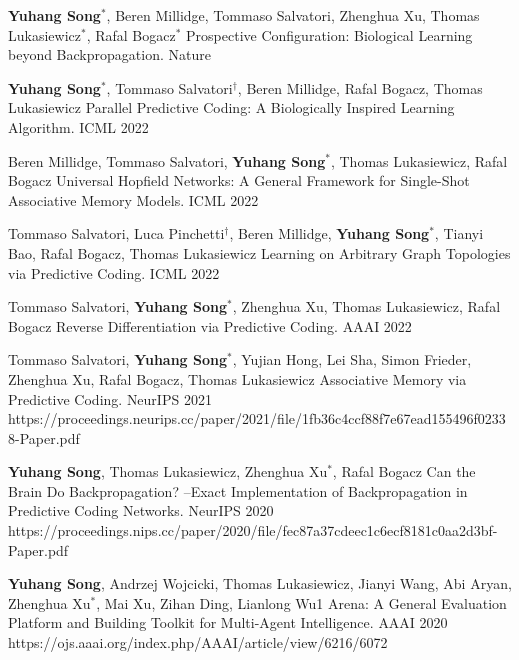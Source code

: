     \Preprint
    {\textbf{Yuhang Song$^*$},
    Beren Millidge,
    Tommaso Salvatori,
    Zhenghua Xu,
    Thomas Lukasiewicz$^*$, 
    Rafal Bogacz$^*$}
    {Prospective Configuration: Biological Learning beyond Backpropagation.}
    {Nature}
    {}
    
    \Preprint
    {\textbf{Yuhang Song$^*$}, 
    Tommaso Salvatori$^\dag$,
    Beren Millidge,
    Rafal Bogacz,
    Thomas Lukasiewicz}
    {Parallel Predictive Coding: A Biologically Inspired Learning Algorithm.}
    {ICML 2022}
    {}
    
    \Preprint
    {Beren Millidge,
    Tommaso Salvatori,
    \textbf{Yuhang Song$^*$}, 
    Thomas Lukasiewicz,
    Rafal Bogacz}
    {Universal Hopfield Networks: A General Framework for Single-Shot Associative Memory Models.}
    {ICML 2022}
    {}
    
    \Preprint
    {Tommaso Salvatori,
    Luca Pinchetti$^\dag$,
    Beren Millidge,
    \textbf{Yuhang Song$^*$},
    Tianyi Bao,
    Rafal Bogacz,
    Thomas Lukasiewicz}
    {Learning on Arbitrary Graph Topologies via Predictive Coding.}
    {ICML 2022}
    {}
	
	\Conference
	{Tommaso Salvatori,
    \textbf{Yuhang Song}$^{*}$,
    Zhenghua Xu,
    Thomas Lukasiewicz, 
    Rafal Bogacz}
    {Reverse Differentiation via Predictive Coding.}
    {AAAI 2022}
    {}
    
    \Conference
    {Tommaso Salvatori,
    \textbf{Yuhang Song}$^{*}$, 
    Yujian Hong,
    Lei Sha,
    Simon Frieder,
    Zhenghua Xu,
    Rafal Bogacz, 
    Thomas Lukasiewicz}
    {Associative Memory via Predictive Coding.}
    {NeurIPS 2021}
    {https://proceedings.neurips.cc/paper/2021/file/1fb36c4ccf88f7e67ead155496f02338-Paper.pdf}
    
    \Conference
    {\textbf{Yuhang Song}, 
    Thomas Lukasiewicz, 
    Zhenghua Xu$^*$, 
    Rafal Bogacz}
    {Can the Brain Do Backpropagation? --Exact Implementation of Backpropagation in Predictive Coding Networks.}
    {NeurIPS 2020}
    {https://proceedings.nips.cc/paper/2020/file/fec87a37cdeec1c6ecf8181c0aa2d3bf-Paper.pdf}
    
    \Conference
    {\textbf{Yuhang Song}, 
    Andrzej Wojcicki, 
    Thomas Lukasiewicz, 
    Jianyi Wang, 
    Abi Aryan, 
    Zhenghua Xu$^*$, 
    Mai Xu, 
    Zihan Ding, 
    Lianlong Wu1}
    {Arena: A General Evaluation Platform and Building Toolkit for Multi-Agent Intelligence.}
    {AAAI 2020}
    {https://ojs.aaai.org/index.php/AAAI/article/view/6216/6072}
    
